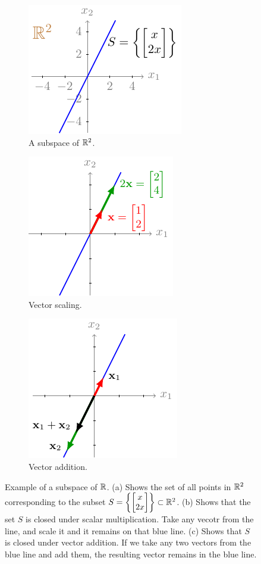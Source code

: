 \begin{figure}[h]
    \centering
    \begin{subfigure}[b]{0.32\textwidth}
        \includegraphics{figure/chapter01/subspace1(a).pdf}
        \caption{A subspace of $\mathbb{R}^2$.}
        \label{fig:subspace1}
    \end{subfigure}
    \begin{subfigure}[b]{0.32\textwidth}
        \centering
        \includegraphics{figure/chapter01/subspace1(b).pdf}
        \caption{Vector scaling.}
        \label{fig:subspace1-scale}
    \end{subfigure}
    \begin{subfigure}[b]{0.32\textwidth}
        \centering
        \includegraphics{figure/chapter01/subspace1(c).pdf}
        \caption{Vector addition.}
        \label{fig:subspace1-addition}
    \end{subfigure}
    \caption{Example of a subspace of $\mathbb{R}$. (a) Shows the set of all points in $\mathbb{R}^2$ corresponding to the subset $S = \left\{ \bmxc x \\ 2 x\emx\right\} \subset \mb{R}^2$. (b) Shows that the set $S$ is closed under scalar multiplication. Take any vecotr from the line, and scale it and it remains on that blue line. (c) Shows that $S$ is closed under vector addition. If we take any two vectors from the blue line and add them, the resulting vector remains in the blue line.}
\end{figure}    
    
